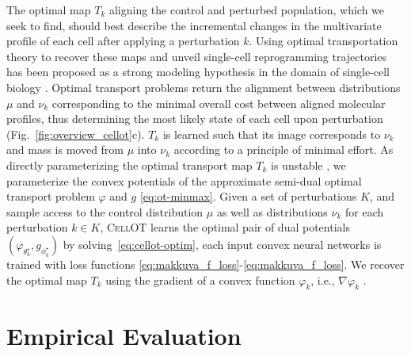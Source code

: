  The optimal map $T_k$ aligning the control and perturbed population, which we seek to find, should best describe the incremental changes in the multivariate profile of each cell after applying a perturbation $k$. Using optimal transportation theory \citep{villani2021topics, santambrogio2015optimal} to recover these maps and unveil single-cell reprogramming trajectories has been proposed as a strong modeling hypothesis in the domain of single-cell biology \citep{schiebinger2019optimal, cang2020inferring, demetci2022scot, huizing2022optimal, lavenant2021towards, zhang2021optimal}.
Optimal transport problems return the alignment between distributions $\mu$ and $\nu_k$ corresponding to the minimal overall cost between aligned molecular profiles, thus determining the most likely state of each cell upon perturbation (Fig.~\ref{fig:overview_cellot}c).
$T_k$ is learned such that its image corresponds to $\nu_k$ and mass is moved from $\mu$ into $\nu_k$ according to a principle of minimal effort.
As directly parameterizing the optimal transport map $T_k$ \citep{korotin2021wasserstein, yang2018scalable, prasad2020optimal} is unstable \citep[Table 1]{makkuva2020optimal}, we parameterize the convex potentials of the approximate semi-dual optimal transport problem $\varphi$ and $g$ \eqref{eq:ot-minmax}.
Given a set of perturbations $K$, and sample access to the control distribution $\mu$ as well as  distributions $\nu_k$ for each perturbation $k \in K$, \textsc{CellOT} learns the optimal pair of dual potentials $(\varphi_{\theta_k^\star}, g_{\phi_k^\star})$ by solving~\eqref{eq:cellot-optim}, each input convex neural networks \citep{amos2017input} is trained with loss functions \eqref{eq:makkuva_f_loss}-\eqref{eq:makkuva_f_loss}. We recover the optimal map $T_k$ using the gradient of a convex function $\varphi_k$, i.e., $\nabla \varphi_k$ \citep{makkuva2020optimal}.

\section{Empirical Evaluation}


